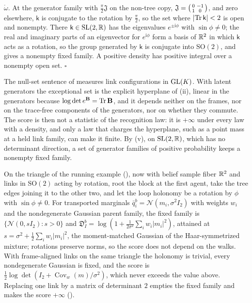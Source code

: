 \(\mathring\omega\). At the generator family with \(\frac\pi2\mathfrak J\) on the non-tree copy,
\(\mathfrak J=\begin{psmallmatrix}0&-1\\1&0\end{psmallmatrix}\), and zero elsewhere, \(\mathsf k\) is conjugate to
the rotation by \(\frac\pi2\), so the set where \(\lvert\operatorname{Tr}\mathsf k\rvert<2\) is open and nonempty. There
\(\mathsf k\in\mathrm{SL}(2,\mathbb R)\) has the eigenvalues \(e^{\pm\mathrm i\phi}\) with \(\sin\phi\neq0\); the real and
imaginary parts of an eigenvector for \(e^{\mathrm i\phi}\) form a basis of \(\mathbb R^2\) in which \(\mathsf k\) acts as
a rotation, so the group generated by \(\mathsf k\) is conjugate into \(\mathrm{SO}(2)\), and
 gives a nonempty fixed family. A positive density has positive
integral over a nonempty open set. $\square$

The null-set sentence of  measures link configurations in
\(\mathrm{GL}(K)\). With latent generators the exceptional set is the explicit hyperplane of (ii), linear in the
generators because \(\log\det e^{\mathbf B}=\operatorname{Tr}\mathbf B\), and it depends neither on the frames, nor on the
trace-free components of the generators, nor on whether they commute. The score is then not a statistic of
the recognition law: it is \(+\infty\) under every law with a density, and only a law that charges the
hyperplane, such as a point mass at a held link family, can make it finite. By (v), on
\(\mathrm{SL}(2,\mathbb R)\), which has no determinant direction, a set of generator families of positive
probability keeps a nonempty fixed family.

On the triangle of the running example (), now with belief sample fiber
$\mathbb R^2$ and links in $\mathrm{SO}(2)$ acting by rotation, root the block at the first agent, take the tree
edges joining it to the other two, and let the loop holonomy be a rotation by $\phi$ with $\sin\phi\neq0$.
For transported marginals $\bar q^b_i=\mathcal N(m_i,\sigma^2I_2)$ with weights $w_i$ and the nondegenerate
Gaussian parent family, the fixed family is $\{\mathcal N(0,sI_2):s>0\}$ and
$\mathfrak D^b_I=\log(1+\tfrac{1}{2\sigma^2}\sum_iw_i\lvert m_i\rvert^2)$, attained at
$s=\sigma^2+\tfrac12\sum_iw_i\lvert m_i\rvert^2$, the moment-matched Gaussian of the Haar-symmetrized
mixture; rotations preserve norms, so the score does not depend on the walks. With frame-aligned links on
the same triangle the holonomy is trivial, every nondegenerate Gaussian is fixed, and the score is
$\tfrac12\log\det(I_2+\operatorname{Cov}_w(m)/\sigma^2)$, which never exceeds the value above. Replacing one
link by a matrix of determinant $2$ empties the fixed family and makes the score $+\infty$
(). 

